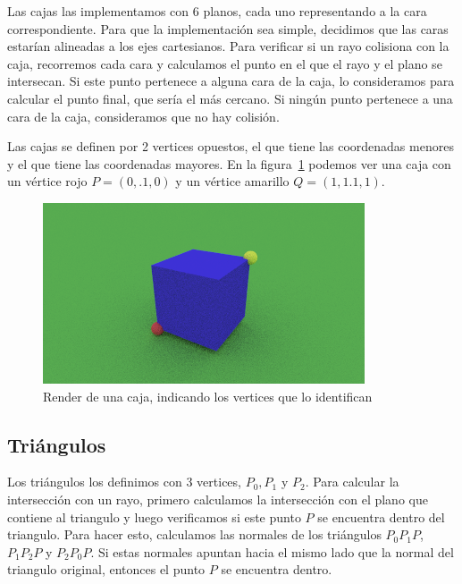 Las cajas las implementamos con 6 planos, cada uno representando a la cara correspondiente.
Para que la implementación sea simple, decidimos que las caras estarían alineadas a los ejes
cartesianos.
Para verificar si un rayo colisiona con la caja, recorremos cada cara y calculamos el punto en el
que el rayo y el plano se intersecan.
Si este punto pertenece a alguna cara de la caja, lo consideramos para calcular el punto final,
que sería el más cercano.
Si ningún punto pertenece a una cara de la caja, consideramos que no hay colisión.

Las cajas se definen por 2 vertices opuestos, el que tiene las coordenadas menores y el que tiene
las coordenadas mayores.
En la figura~\ref{fig:escena_caja_vertices} podemos ver una caja con un vértice rojo $P=(0,.1,0)$
y un vértice amarillo $Q=(1,1.1,1)$.

\begin{figure}[H]
    \centering
    \includegraphics[width=.9\textwidth]{imgs/escena_caja_vertices}
    \caption{Render de una caja, indicando los vertices que lo identifican}
    \label{fig:escena_caja_vertices}
\end{figure}

\subsection{Triángulos} \label{subsec:triangulos}

Los triángulos los definimos con 3 vertices, $P_0, P_1$ y $P_2$.
Para calcular la intersección con un rayo, primero calculamos la intersección con el plano que
contiene al triangulo y luego verificamos si este punto $P$ se encuentra dentro del triangulo.
Para hacer esto, calculamos las normales de los triángulos $P_0 P_1 P$, $P_1 P_2 P$ y $P_2 P_0 P$.
Si estas normales apuntan hacia el mismo lado que la normal del triangulo original, entonces el
punto $P$ se encuentra dentro.

